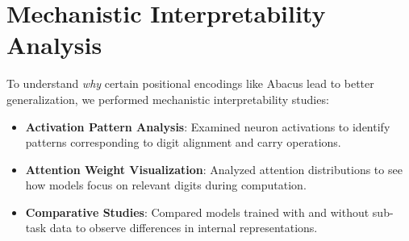 \section{Mechanistic Interpretability Analysis}

To understand \emph{why} certain positional encodings like Abacus lead to better generalization, we performed mechanistic interpretability studies:

\begin{itemize}
    \item \textbf{Activation Pattern Analysis}: Examined neuron activations to identify patterns corresponding to digit alignment and carry operations.
    \item \textbf{Attention Weight Visualization}: Analyzed attention distributions to see how models focus on relevant digits during computation.
    \item \textbf{Comparative Studies}: Compared models trained with and without sub-task data to observe differences in internal representations.
\end{itemize}
